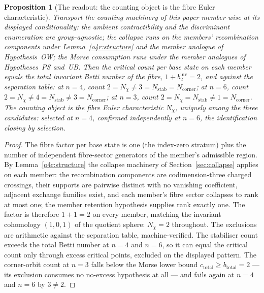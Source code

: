 \documentclass[11pt]{article}
\numberwithin{equation}{section}
\theoremstyle{plain}
\newtheorem{proposition}[theorem]{Proposition}
\theoremstyle{definition}
\theoremstyle{remark}
\begin{document}
\begin{proposition}[The readout: the counting object is the fibre
Euler characteristic]\label{o4r:verdict}
Transport the counting machinery of this paper member-wise at its
displayed conditionality: the ambient contractibility and the
discriminant enumeration are group-agnostic; the collapse runs on
the members' recombination components under
Lemma~\textup{\ref{o4r:structure}} and the member analogue of
Hypothesis~\textup{OW}; the Morse consumption runs under the
member analogues of Hypotheses~\textup{PS} and~\textup{UB}. Then
the critical count per base state on each member equals the total
invariant Betti number of the fibre,
$1 + b_{2}^{\mathrm{inv}} = 2$, and against the separation table:
at $n = 4$, count $2 = N_{\chi} \neq 3 = N_{\mathrm{stab}} =
N_{\mathrm{corner}}$; at $n = 6$, count $2 = N_{\chi} \neq 4 =
N_{\mathrm{stab}} \neq 3 = N_{\mathrm{corner}}$; at $n = 3$,
count $2 = N_{\chi} = N_{\mathrm{stab}} \neq 1 =
N_{\mathrm{corner}}$. The counting object is the fibre Euler
characteristic $N_{\chi}$, uniquely among the three candidates:
selected at $n = 4$, confirmed independently at $n = 6$, the
identification closing by selection.
\end{proposition}

\begin{proof}
The fibre factor per base state is one (the index-zero stratum)
plus the number of independent fibre-sector generators of the
member's admissible region. By Lemma~\ref{o4r:structure} the
collapse machinery of Section~\ref{sec:collapse} applies on each
member: the recombination components are codimension-three charged
crossings, their supports are pairwise distinct with no vanishing
coefficient, adjacent exchange families exist, and each member's
fibre sector collapses to rank at most one; the member retention
hypothesis supplies rank exactly one. The factor is therefore
$1 + 1 = 2$ on every member, matching the invariant cohomology
$(1, 0, 1)$ of the quotient sphere: $N_{\chi} = 2$ throughout.
The exclusions are arithmetic against the separation table,
machine-verified. The stabiliser count exceeds the total Betti
number at $n = 4$ and $n = 6$, so it can equal the critical count
only through excess critical points, excluded on the displayed
pattern. The corner-orbit count at $n = 3$ falls below the Morse
lower bound $c_{\mathrm{total}} \geq b_{\mathrm{total}} = 2$
\cite{Palais1963, Milnor1963} --- its exclusion consumes no
no-excess hypothesis at all --- and fails again at $n = 4$ and
$n = 6$ by $3 \neq 2$.
\end{proof}
\end{document}
